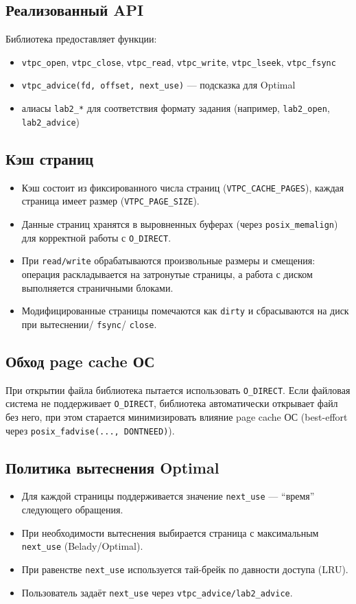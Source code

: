 \documentclass[12pt,a4paper]{article}
\begin{document}
\subsection{Реализованный API}
Библиотека предоставляет функции:
\begin{itemize}
  \item \texttt{vtpc\_open}, \texttt{vtpc\_close}, \texttt{vtpc\_read}, \texttt{vtpc\_write}, \texttt{vtpc\_lseek}, \texttt{vtpc\_fsync}
  \item \texttt{vtpc\_advice(fd, offset, next\_use)} --- подсказка для Optimal
  \item алиасы \texttt{lab2\_*} для соответствия формату задания (например, \texttt{lab2\_open}, \texttt{lab2\_advice})
\end{itemize}

\subsection{Кэш страниц}
\begin{itemize}
  \item Кэш состоит из фиксированного числа страниц (\texttt{VTPC\_CACHE\_PAGES}), каждая страница имеет размер (\texttt{VTPC\_PAGE\_SIZE}).
  \item Данные страниц хранятся в выровненных буферах (через \texttt{posix\_memalign}) для корректной работы с \texttt{O\_DIRECT}.
  \item При \texttt{read/write} обрабатываются произвольные размеры и смещения: операция раскладывается на затронутые страницы, а работа с диском выполняется страничными блоками.
  \item Модифицированные страницы помечаются как \texttt{dirty} и сбрасываются на диск при вытеснении/ \texttt{fsync}/ \texttt{close}.
\end{itemize}

\subsection{Обход page cache ОС}
При открытии файла библиотека пытается использовать \texttt{O\_DIRECT}.
Если файловая система не поддерживает \texttt{O\_DIRECT}, библиотека автоматически открывает файл без него, при этом старается минимизировать влияние page cache ОС (best-effort через \texttt{posix\_fadvise(..., DONTNEED)}).

\subsection{Политика вытеснения Optimal}
\begin{itemize}
  \item Для каждой страницы поддерживается значение \texttt{next\_use} --- ``время'' следующего обращения.
  \item При необходимости вытеснения выбирается страница с максимальным \texttt{next\_use} (Belady/Optimal).
  \item При равенстве \texttt{next\_use} используется тай-брейк по давности доступа (LRU).
  \item Пользователь задаёт \texttt{next\_use} через \texttt{vtpc\_advice/lab2\_advice}.
\end{itemize}
\end{document}

